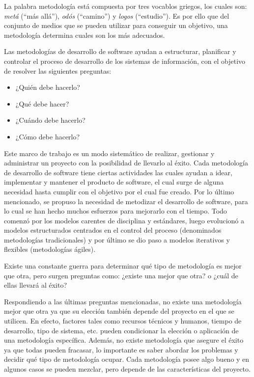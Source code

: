 La palabra metodología está compuesta por tres vocablos griegos, los cuales son: \textit{metá} (``más allá''), \textit{odós} (``camino'') y \textit{logos} (``estudio''). Es por ello que del conjunto de medios que se pueden utilizar para conseguir un objetivo, una metodología determina cuales son los más adecuados.

Las metodologías de desarrollo de software ayudan a estructurar, planificar y controlar el proceso de desarrollo de los sistemas de información, con el objetivo de resolver las siguientes preguntas:

\begin{itemize}
    \item ¿Quién debe hacerlo?
    \item ¿Qué debe hacer?
    \item ¿Cuándo debe hacerlo?
    \item ¿Cómo debe hacerlo?
\end{itemize}

Este marco de trabajo es un modo sistemático de realizar, gestionar y administrar un proyecto con la posibilidad de llevarlo al éxito. Cada metodología de desarrollo de software tiene ciertas actividades las cuales ayudan a idear, implementar y mantener el producto de software, el cual surge de alguna necesidad hasta cumplir con el objetivo por el cual fue creado. Por lo último mencionado, se propuso la necesidad de metodizar el desarrollo de software, para lo cual se han hecho muchos esfuerzos para mejorarlo con el tiempo. Todo comenzó por los modelos carentes de disciplina y estándares, luego evolucionó a modelos estructurados centrados en el control del proceso (denominados metodologías tradicionales) y por último se dio paso a modelos iterativos y flexibles (metodologías ágiles).

Existe una constante guerra para determinar qué tipo de metodología es mejor que otra, pero surgen preguntas como: ¿existe una mejor que otra? o ¿cuál de ellas llevará al éxito? 

Respondiendo a las últimas preguntas mencionadas, no existe una metodología mejor que otra ya que su elección también depende del proyecto en el que se utilicen. En efecto, factores tales como recursos técnicos y humanos, tiempo de desarrollo, tipo de sistema, etc. pueden condicionar la elección o aplicación de una metodología específica. Además, no existe metodología que asegure el éxito ya que todas pueden fracasar, lo importante es saber abordar los problemas y decidir qué tipo de metodología ocupar. Cada metodología posee algo bueno y en algunos casos se pueden mezclar, pero depende de las características del proyecto.


